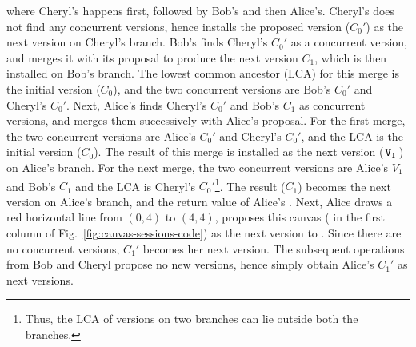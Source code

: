 where Cheryl's  happens first, followed by Bob's and then
Alice's.  Cheryl's  does not find any concurrent versions,
hence installs the proposed version ($C_0'$) as the next version on
Cheryl's branch. Bob's  finds Cheryl's $C_0'$ as a concurrent
version, and merges it with its proposal to produce the next version
$C_1$, which is then installed on Bob's branch.  The lowest common
ancestor (LCA) for this merge is the initial version ($C_0$), and the
two concurrent versions are Bob's $C_0'$ and Cheryl's $C_0'$. Next,
Alice's  finds Cheryl's $C_0'$ and Bob's $C_1$ as concurrent
versions, and merges them successively with Alice's proposal. For the
first merge, the two concurrent versions are Alice's $C_0'$ and
Cheryl's $C_0'$, and the LCA is the initial version ($C_0$). The
result of this merge is installed as the next version ($\,{\tt V_1}\,$) on
Alice's branch. For the next merge, the two concurrent versions are
Alice's $V_1$ and Bob's $C_1$ and the LCA is Cheryl's
$C_0'$\footnote{Thus, the LCA of versions on two branches can lie
  outside both the branches.}. The result ($C_1$) becomes the next
version on Alice's branch, and the return value of Alice's .
Next, Alice draws a red horizontal line from $(0,4)$ to $(4,4)$,
proposes this canvas ( in the first column of
Fig.~\ref{fig:canvas-sessions-code}) as the next version to .
Since there are no concurrent versions, $C_1'$ becomes her next
version. The subsequent  operations from Bob and Cheryl
propose no new versions, hence simply obtain Alice's $C_1'$ as next
versions.

